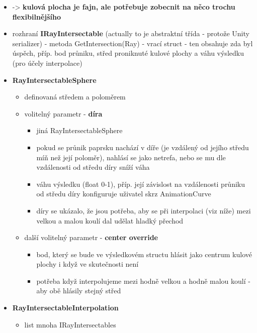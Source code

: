 \begin{itemize}
\begin{itemize}
            \item -> \textbf{kulová plocha je fajn, ale potřebuje zobecnit na něco trochu flexibilnějšího}
            \item rozhraní \textbf{IRayIntersectable} (actually to je abstraktní třída - protože Unity serializer) - metoda GetIntersection(Ray) - vrací struct - ten obsahuje zda byl úspěch, příp. bod průniku, střed proniknuté kulové plochy a váhu výsledku (pro účely interpolace)
            \item \textbf{RayIntersectableSphere}
                \begin{itemize}
                    \item definovaná středem a poloměrem
                    \item volitelný parametr - \textbf{díra}
                        \begin{itemize}
                            \item jiná RayIntersectableSphere
                            \item pokud se průnik paprsku nachází v díře (je vzdálený od jejího středu míň než její poloměr), nahlásí se jako netrefa, nebo se mu dle vzdálenosti od středu díry sníží váha
                            \item váhu výsledku (float 0-1), příp. její závislost na vzdálenosti průniku od středu díry konfiguruje uživatel skrz AnimationCurve
                            \item díry se ukázalo, že jsou potřeba, aby se při interpolaci (viz níže) mezi velkou a malou koulí dal udělat hladký přechod
                        \end{itemize}
                    \item další volitelný parametr - \textbf{center override}
                    \begin{itemize}
                        \item bod, který se bude ve výsledkovém structu hlásit jako centrum kulové plochy i když ve skutečnosti není
                        \item potřeba když interpolujeme mezi hodně velkou a hodně malou koulí - aby obě hlásily stejný střed
                    \end{itemize}
                \end{itemize}
            \item \textbf{RayIntersectableInterpolation}
                \begin{itemize}
                    \item list mnoha IRayIntersectables

\end{itemize}
\end{itemize}
\end{itemize}

